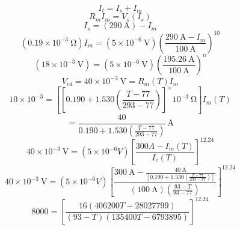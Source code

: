 \begin{equation}%
I_t=I_s+I_m
\end{equation}
\begin{equation}%
R_mI_m=V_s(I_s)
\end{equation}
\begin{equation}%
I_s=(290\ \mathrm{A})-I_m
\end{equation}
\begin{equation}%
(0.19\times10^{-3}\ \mathrm{\Omega})I_m=(5\times10^{-6}\ \mathrm{V})(\frac{290\ \mathrm {A}-I_m}{100\ \mathrm{A}})^{10}
\end{equation}
\begin{equation}%
(18\times10^{-3}\ \mathrm{V})=(5\times10^{-6}\ \mathrm{V})(\frac{195.26\ \mathrm{A}}{100\ \mathrm{A}})^n
\end{equation}
\begin{equation}%
V_{cd}=40\times10^{-3}\ \mathrm{V}=R_m(T)I_m
\end{equation}
\begin{equation}%
10\times10^{-3}=[{[0.190+1.530(\frac{T-77}{293-77})]^\times10^{-3}\ \mathrm{\Omega}}]I_m(T)
\end{equation}
\begin{equation}%
\end{equation}
\begin{equation}%
=\frac{40}{0.190+1.530(\frac{T-77}{293-77})}\ \mathrm{A}
\end{equation}
\begin{equation}%
40\times10^{-3}\ \mathrm{V}=(5\times10^{-6}V)[\frac{300A-I_m(T)}{I_c(T)}]^{12.24}
\end{equation}
\begin{equation}%
40\times10^{-3}\ \mathrm{V}=(5\times10^{-6}V)[\frac{300\ \mathrm{A}-\frac{40\ \mathrm{A}}{[0.190+1.530(\frac{T-77}{293-77})]}}{(100\ \mathrm{A})(\frac{93-T}{93-77})}]^{12.24}
\end{equation}
\begin{equation}%
8000=[\frac{16(406200T-28027799)}{(93-T)(135400T-6793895)}]^{12.24}
\end{equation}


